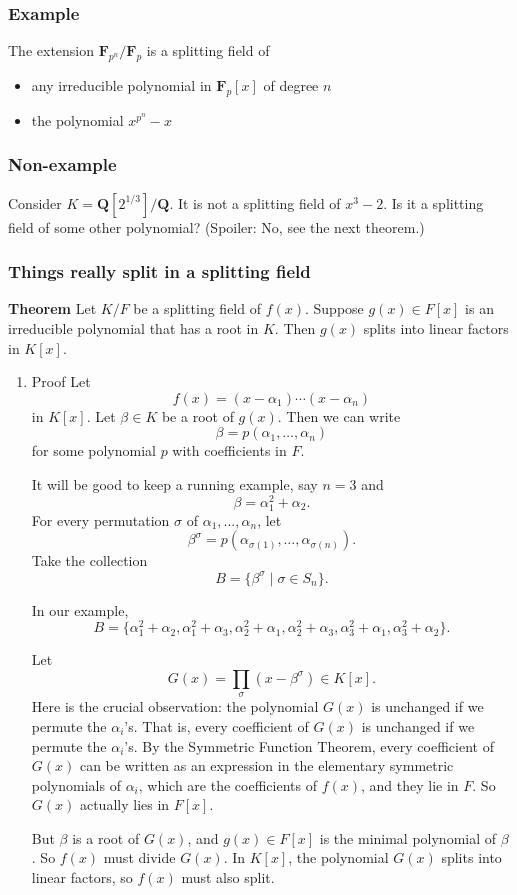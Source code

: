 \documentclass[11pt]{article}
\begin{document}
\subsubsection{Example}
\label{sec:org75f959f}
The extension \(\mathbf{F}_{p^{n}}/ \mathbf{F}_p\) is a splitting field of
\begin{itemize}
\item any irreducible polynomial in \(\mathbf{F}_p[x]\) of degree \(n\)
\item the polynomial \(x^{p^n}-x\)
\end{itemize}
\subsubsection{Non-example}
\label{sec:org959689c}
Consider \(K = \mathbf{Q}[2^{1/3}] / \mathbf{Q}\).
It is not a splitting field of \(x^3-2\).
Is it a splitting field of some other polynomial? (Spoiler: No, see the next theorem.)
\subsubsection{Things really split in a splitting field}
\label{sec:orgfd3b706}

\textbf{Theorem} Let \(K/F\) be a splitting field of \(f(x)\).
Suppose \(g(x) \in F[x]\) is an irreducible polynomial that has a root in \(K\).
Then \(g(x)\) splits into linear factors in \(K[x]\).
\begin{enumerate}
\item Proof
\label{sec:org5aa11d7}
Let
\[ f(x) = (x-\alpha_{1}) \cdots (x-\alpha_{n})\]
in \(K[x]\).
Let \(\beta \in K\) be a root of \(g(x)\).
Then we can write
\[ \beta = p(\alpha_1, \dots, \alpha_{n})\]
for some polynomial \(p\) with coefficients in \(F\).

It will be good to keep a running example, say \(n = 3\) and
\[ \beta = \alpha_{1}^2 + \alpha_{2}.\]
For every permutation \(\sigma\) of \(\alpha_{1}, \dots, \alpha_{n}\), let
\[ \beta^{\sigma} = p(\alpha_{\sigma(1)}, \dots, \alpha_{\sigma(n)}).\]
Take the collection
\[ B = \{\beta^{\sigma} \mid \sigma \in S_{n}\}.\]

In our example,
\[ B = \{\alpha_{1}^2+\alpha_{2}, \alpha_{1}^2+\alpha_{3}, \alpha_{2}^2+\alpha_{1}, \alpha_{2}^2+\alpha_{3}, \alpha_{3}^2+\alpha_{1}, \alpha_{3}^2+\alpha_{2}\}.\]

Let
\[ G(x) = \prod_{\sigma}(x-\beta^{\sigma}) \in K[x].\]
Here is the crucial observation: the polynomial \(G(x)\) is unchanged if we permute the \(\alpha_{i}\)'s.
That is, every coefficient of \(G(x)\) is unchanged if we permute the \(\alpha_{i}\)'s.
By the Symmetric Function Theorem, every coefficient of \(G(x)\) can be written as an expression in the elementary symmetric polynomials of \(\alpha_{i}\), which are the coefficients of \(f(x)\), and they lie in \(F\).
So \(G(x)\) actually lies in \(F[x]\).

But \(\beta\) is a root of \(G(x)\), and \(g(x) \in F[x]\) is the minimal polynomial of \(\beta\).
So \(f(x)\) must divide \(G(x)\).
In \(K[x]\), the polynomial \(G(x)\) splits into linear factors, so \(f(x)\) must also split.
\end{enumerate}
\end{document}
